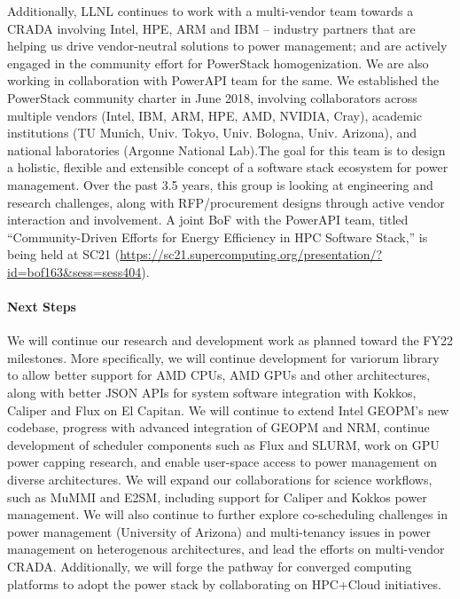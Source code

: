 Additionally, LLNL continues to work with a multi-vendor team towards a CRADA involving Intel, HPE, ARM and IBM -- industry partners that are helping us drive vendor-neutral solutions to power management; and are actively engaged in the community effort for PowerStack homogenization. We are also working in collaboration with PowerAPI team for the same. We established the PowerStack community charter in June 2018, involving collaborators across multiple vendors (Intel, IBM, ARM, HPE, AMD, NVIDIA, Cray), academic institutions (TU Munich, Univ. Tokyo, Univ. Bologna, Univ. Arizona), and national laboratories (Argonne National Lab).The goal for this team is to design a holistic, flexible and extensible concept of a software stack ecosystem for power management. Over the past 3.5 years, this group is looking at engineering and research challenges, along with RFP/procurement designs through active vendor interaction and involvement. A joint BoF with the PowerAPI team, titled ``Community-Driven Efforts for Energy Efficiency in HPC Software Stack,''  is being held at SC21 (\url{https://sc21.supercomputing.org/presentation/?id=bof163&sess=sess404}). 

\paragraph{Next Steps}
We will continue our research and development work as planned toward the FY22 milestones. More specifically, we will continue development for variorum library to allow better support for AMD CPUs, AMD GPUs and other architectures, along with better JSON APIs for system software integration with Kokkos, Caliper and Flux on El Capitan. We will continue to extend Intel GEOPM's new codebase, progress with advanced integration of GEOPM and NRM, continue development of scheduler components such as Flux and SLURM, work on GPU power capping research, and enable user-space access to power management on diverse architectures. We will expand our collaborations for science workflows, such as MuMMI and E2SM, including support for Caliper and Kokkos power management. We will also continue to further explore co-scheduling challenges in power management (University of Arizona) and multi-tenancy issues in power management on heterogenous architectures, and lead the efforts on multi-vendor CRADA. Additionally, we will forge the pathway for converged computing platforms to adopt the power stack by collaborating on HPC+Cloud initiatives. 
